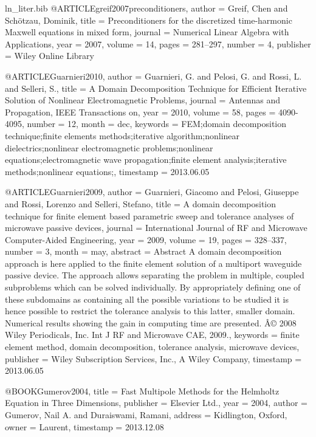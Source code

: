 \begin{filecontents*}{ln_liter.bib}
@ARTICLE{greif2007preconditioners,
  author = {Greif, Chen and Sch{\"o}tzau, Dominik},
  title = {Preconditioners for the discretized time-harmonic {M}axwell equations
	in mixed form},
  journal = {Numerical Linear Algebra with Applications},
  year = {2007},
  volume = {14},
  pages = {281--297},
  number = {4},
  publisher = {Wiley Online Library}
}

@ARTICLE{Guarnieri2010,
  author = {Guarnieri, G. and Pelosi, G. and Rossi, L. and Selleri, S.},
  title = {A Domain Decomposition Technique for Efficient Iterative Solution
	of Nonlinear Electromagnetic Problems},
  journal = {Antennas and Propagation, IEEE Transactions on},
  year = {2010},
  volume = {58},
  pages = {4090-4095},
  number = {12},
  month = dec,
  keywords = {FEM;domain decomposition technique;finite elements methods;iterative
	algorithm;nonlinear dielectrics;nonlinear electromagnetic problems;nonlinear
	equations;electromagnetic wave propagation;finite element analysis;iterative
	methods;nonlinear equations;},
  timestamp = {2013.06.05}
}

@ARTICLE{Guarnieri2009,
  author = {Guarnieri, Giacomo and Pelosi, Giuseppe and Rossi, Lorenzo and Selleri,
	Stefano},
  title = {A domain decomposition technique for finite element based parametric
	sweep and tolerance analyses of microwave passive devices},
  journal = {International Journal of RF and Microwave Computer-Aided Engineering},
  year = {2009},
  volume = {19},
  pages = {328--337},
  number = {3},
  month = may,
  abstract = {Abstract A domain decomposition approach is here applied to the finite
	element solution of a multiport waveguide passive device. The approach
	allows separating the problem in multiple, coupled subproblems which
	can be solved individually. By appropriately defining one of these
	subdomains as containing all the possible variations to be studied
	it is hence possible to restrict the tolerance analysis to this latter,
	smaller domain. Numerical results showing the gain in computing time
	are presented. Â© 2008 Wiley Periodicals, Inc. Int J RF and Microwave
	CAE, 2009.},
  keywords = {finite element method, domain decomposition, tolerance analysis, microwave
	devices},
  publisher = {Wiley Subscription Services, Inc., A Wiley Company},
  timestamp = {2013.06.05}
}

@BOOK{Gumerov2004,
  title = {Fast Multipole Methods for the {H}elmholtz Equation in Three Dimensions},
  publisher = {Elsevier Ltd.},
  year = {2004},
  author = {Gumerov, Nail A. and Duraiswami, Ramani},
  address = {Kidlington, Oxford},
  owner = {Laurent},
  timestamp = {2013.12.08}
}


\end{filecontents*}

